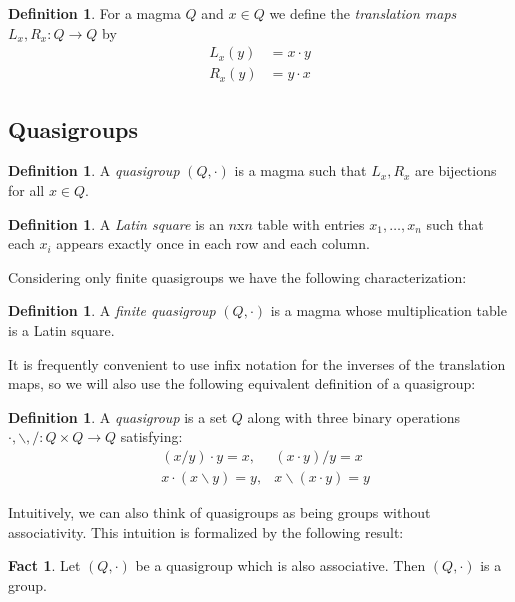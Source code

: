 \documentclass[12pt]{report}
\theoremstyle{definition}
\newtheorem{fct}[thm]{Fact}
\newtheorem{dfn}[thm]{Definition}
\newcommand{\ldv}{\backslash}       %
\newcommand{\rdv}{/}                %
\begin{document}
\begin{dfn}
  For a magma $Q$ and $x\in Q$ we define the \emph{translation maps} $L_x, R_x:Q\to Q$ by
  \begin{align*}
    L_x(y) &= x\cdot y\\
    R_x(y) &= y\cdot x
  \end{align*}
\end{dfn}

\subsection{Quasigroups}

\begin{dfn}
  A \emph{quasigroup} $(Q, \cdot)$ is a magma such that $L_x, R_x$ are bijections for all $x\in Q$.
\end{dfn}

\begin{dfn}
  A \emph{Latin square} is an $n$x$n$ table with entries $x_1, \ldots, x_n$ such that each $x_i$ appears exactly once
    in each row and each column.
\end{dfn}

Considering only finite quasigroups we have the following characterization:

\begin{dfn}
  A \emph{finite quasigroup} $(Q, \cdot)$ is a magma whose multiplication table is a Latin square.
\end{dfn}

It is frequently convenient to use infix notation for the inverses of the translation maps, so we will also use the
  following equivalent definition of a quasigroup:

\begin{dfn}
  A \emph{quasigroup} is a set $Q$ along with three binary operations $\cdot, \ldv, \rdv:Q\times Q\to Q$ satisfying:
  \begin{align*}
    &(x\rdv y)\cdot y = x, &(x\cdot y)\rdv y = x\\
    &x\cdot (x\ldv y) = y, &x\ldv (x\cdot y) = y
  \end{align*}
\end{dfn}

Intuitively, we can also think of quasigroups as being groups without associativity. This intuition is formalized by
  the following result:

\begin{fct}
  Let $(Q, \cdot)$ be a quasigroup which is also associative. Then $(Q, \cdot)$ is a group.
\end{fct}
\end{document}
